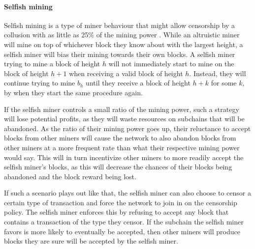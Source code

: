 \paragraph{Selfish mining}
Selfish mining is a type of miner behaviour that might allow censorship by a collusion with as little as 25\% of the mining power \cite{eyal_majority_2018}. While an altruistic miner will mine on top of whichever block they know about with the largest height, a selfish miner will bias their mining towards their own blocks. A selfish miner trying to mine a block of height $h$ will not immediately start to mine on the block of height $h+1$ when receiving a valid block of height $h$. Instead, they will continue trying to mine $b_h$ until they receive a block of height $h+k$ for some $k$, by when they start the same procedure again.

If the selfish miner controls a small ratio of the mining power, such a strategy will lose potential profits, as they will waste resources on subchains that will be abandoned. As the ratio of their mining power goes up, their reluctance to accept blocks from other miners will cause the network to also abandon blocks from other miners at a more frequent rate than what their respective mining power would say. This will in turn incentivize other miners to more readily accept the selfish miner's blocks, as this will decrease the chances of their blocks being abandoned and the block reward being lost.

If such a scenario plays out like that, the selfish miner can also choose to censor a certain type of transaction and force the network to join in on the censorship policy. The selfish miner enforces this by refusing to accept any block that contains a transaction of the type they censor. If the subchain the selfish miner favors is more likely to eventually be accepted, then other miners will produce blocks they are sure will be accepted by the selfish miner.
